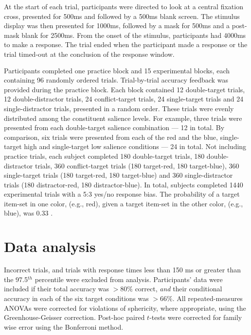 At the start of each trial, participants were directed to look at a central fixation cross, presented for 500ms and followed by a 500ms blank screen. The stimulus display was then presented for 1000ms, followed by a mask for 500ms and a post-mask blank for 2500ms. From the onset of the stimulus, participants had 4000ms to make a response. The trial ended when the participant made a response or the trial timed-out at the conclusion of the response window. 

Participants completed one practice block and 15 experimental blocks, each containing 96 randomly ordered trials. Trial-by-trial accuracy feedback was provided during the practice block. Each block contained 12 double-target trials, 12 double-distractor trials, 24 conflict-target trials, 24 single-target trials and 24 single-distractor trials, presented in a random order. These trials were evenly distributed among the constituent salience levels. For example, three trials were presented from each double-target salience combination --- 12 in total. By comparison, six trials were presented from each of the red and the blue, single-target high and single-target low salience conditions --- 24 in total. Not including practice trials, each subject completed 180 double-target trials, 180 double-distractor trials, 360 conflict-target trials (180 target-red, 180 target-blue), 360 single-target trials (180 target-red, 180 target-blue) and 360 single-distractor trials (180 distractor-red, 180 distractor-blue). In total, subjects completed 1440 experimental trials with a 5:3 yes/no response bias. The probability of a target item-set in one color, (e.g., red), given a target item-set in the other color, (e.g., blue), was 0.33 \cite{mordkoff1991}.

\section{Data analysis}
Incorrect trials, and trials with response times less than 150 ms or greater than the 97.5$^{th}$ percentile were excluded from analysis. Participants' data were included if their total accuracy was $>80\%$ correct, \emph{and} their conditional accuracy in each of the six target conditions was $>66\%$. All repeated-measures ANOVAs were corrected for violations of sphericity, where appropriate, using the Greenhouse-Geisser correction. Post-hoc paired $t$-tests were corrected for family wise error using the Bonferroni method. 

